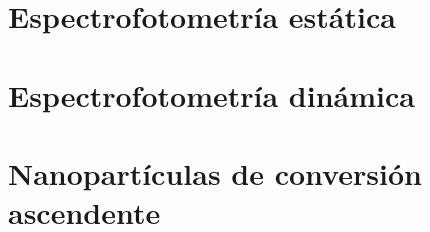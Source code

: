\section{Espectrofotometría estática}
\section{Espectrofotometría dinámica}
\section{Nanopartículas de conversión ascendente}